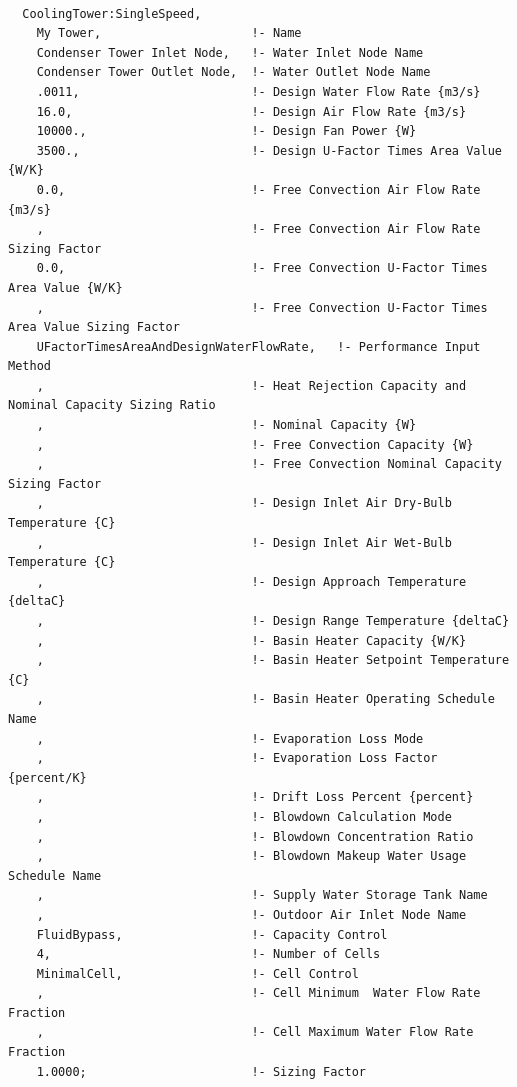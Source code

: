 \begin{lstlisting}

  CoolingTower:SingleSpeed,
    My Tower,                     !- Name
    Condenser Tower Inlet Node,   !- Water Inlet Node Name
    Condenser Tower Outlet Node,  !- Water Outlet Node Name
    .0011,                        !- Design Water Flow Rate {m3/s}
    16.0,                         !- Design Air Flow Rate {m3/s}
    10000.,                       !- Design Fan Power {W}
    3500.,                        !- Design U-Factor Times Area Value {W/K}
    0.0,                          !- Free Convection Air Flow Rate {m3/s}
    ,                             !- Free Convection Air Flow Rate Sizing Factor
    0.0,                          !- Free Convection U-Factor Times Area Value {W/K}
    ,                             !- Free Convection U-Factor Times Area Value Sizing Factor
    UFactorTimesAreaAndDesignWaterFlowRate,   !- Performance Input Method
    ,                             !- Heat Rejection Capacity and Nominal Capacity Sizing Ratio
    ,                             !- Nominal Capacity {W}
    ,                             !- Free Convection Capacity {W}
    ,                             !- Free Convection Nominal Capacity Sizing Factor
    ,                             !- Design Inlet Air Dry-Bulb Temperature {C}
    ,                             !- Design Inlet Air Wet-Bulb Temperature {C}
    ,                             !- Design Approach Temperature {deltaC}
    ,                             !- Design Range Temperature {deltaC}
    ,                             !- Basin Heater Capacity {W/K}
    ,                             !- Basin Heater Setpoint Temperature {C}
    ,                             !- Basin Heater Operating Schedule Name
    ,                             !- Evaporation Loss Mode
    ,                             !- Evaporation Loss Factor {percent/K}
    ,                             !- Drift Loss Percent {percent}
    ,                             !- Blowdown Calculation Mode
    ,                             !- Blowdown Concentration Ratio
    ,                             !- Blowdown Makeup Water Usage Schedule Name
    ,                             !- Supply Water Storage Tank Name
    ,                             !- Outdoor Air Inlet Node Name
    FluidBypass,                  !- Capacity Control
    4,                            !- Number of Cells
    MinimalCell,                  !- Cell Control
    ,                             !- Cell Minimum  Water Flow Rate Fraction
    ,                             !- Cell Maximum Water Flow Rate Fraction
    1.0000;                       !- Sizing Factor


\end{lstlisting}
